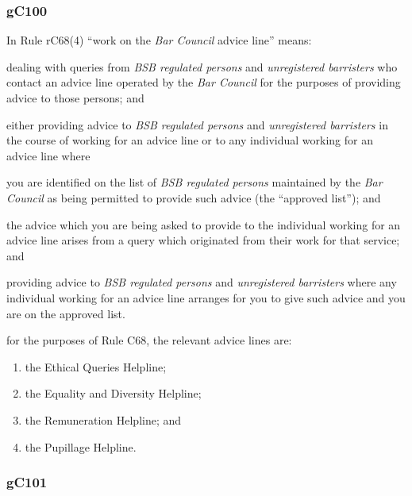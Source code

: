 \subsubsection{\color{darkgrey}gC100}

In Rule rC68(4) ``work on the \emph{Bar Council} advice line'' means:
\begin{numlist}
\item dealing with queries from \emph{BSB regulated persons} and
\emph{unregistered barristers} who contact an advice line operated by
the \emph{Bar Council} for the purposes of providing advice to those
persons; and

\item either providing advice to \emph{BSB regulated persons} and
\emph{unregistered barristers} in the course of working for an advice
line or to any individual working for an advice line where \begin{romlist}\item you are
identified on the list of \emph{BSB regulated persons} maintained by the
\emph{Bar Council} as being permitted to provide such advice (the
``approved list''); and \item the advice which you are being asked to
provide to the individual working for an advice line arises from a query
which originated from their work for that service; and\end{romlist}

\item providing advice to \emph{BSB regulated persons} and
\emph{unregistered barristers} where any individual working for an
advice line arranges for you to give such advice and you are on the
approved list.

\item for the purposes of Rule C68, the relevant advice lines are:
\begin{enumerate}[label=--]
    \item  the Ethical Queries Helpline;

\item the Equality and Diversity Helpline;

\item the Remuneration Helpline; and

\item the Pupillage Helpline.
\end{enumerate}
\end{numlist}
\subsubsection{\color{darkgrey}gC101}

